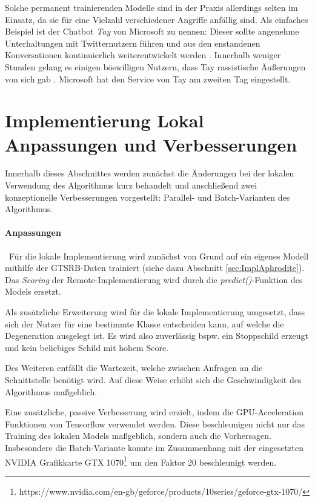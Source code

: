 Solche permanent trainierenden Modelle sind in der Praxis allerdings selten im Einsatz, da sie für eine Vielzahl verschiedener Angriffe anfällig sind. Als einfaches Beispiel ist der Chatbot \textit{Tay} von Microsoft zu nennen: Dieser sollte angenehme Unterhaltungen mit Twitternutzern führen und aus den enstandenen Konversationen kontinuierlich weiterentwickelt werden \cite{mstay}. Innerhalb weniger Stunden gelang es einigen böswilligen Nutzern, dass Tay rassistische Äußerungen von sich gab \cite{mstaydown}. Microsoft hat den Service von Tay am zweiten Tag eingestellt. 
\section[Implementierung Lokal]{Implementierung Lokal \newline Anpassungen und Verbesserungen}
\label{sec:DegenerationLokal}

Innerhalb dieses Abschnittes werden zunächst die Änderungen bei der lokalen Verwendung des Algorithmus kurz behandelt und anschließend zwei konzeptionelle Verbesserungen vorgestellt: Parallel- und Batch-Varianten des Algorithmus. 

\paragraph{Anpassungen} ~\newline Für die lokale Implementierung wird zunächst von Grund auf ein eigenes Modell mithilfe der \ac{GTSRB}-Daten trainiert (siehe dazu Abschnitt \ref{sec:ImplAphrodite}). Das \textit{Scoring} der Remote-Implementierung wird durch die \textit{predict()}-Funktion des Models ersetzt.

Als zusätzliche Erweiterung wird für die lokale Implementierung umgesetzt, dass sich der Nutzer für eine bestimmte Klasse entscheiden kann, auf welche die Degeneration ausgelegt ist. Es wird also zuverlässig bspw. ein Stoppschild erzeugt und kein beliebiges Schild mit hohem Score. 

Des Weiteren entfällt die Wartezeit, welche zwischen Anfragen an die Schnittstelle benötigt wird. Auf diese Weise erhöht sich die Geschwindigkeit des Algorithmus maßgeblich. 

Eine zusätzliche, passive Verbesserung wird erzielt, indem die GPU-Acceleration Funktionen von Tensorflow verwendet werden. Diese beschleunigen nicht nur das Training des lokalen Models maßgeblich, sondern auch die Vorhersagen. Insbesondere die Batch-Variante konnte im Zusammenhang mit der eingesetzten NVIDIA Grafikkarte GTX 1070\footnote{https://www.nvidia.com/en-gb/geforce/products/10series/geforce-gtx-1070/} um den Faktor 20 beschleunigt werden.


